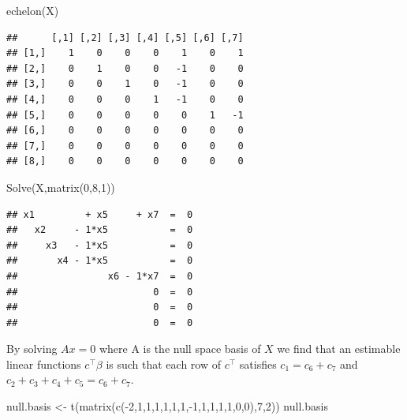 \documentclass[
]{book}
\newenvironment{Shaded}{\begin{snugshade}}{\end{snugshade}}
\newcommand{\DecValTok}[1]{\textcolor[rgb]{0.00,0.00,0.81}{#1}}
\newcommand{\FunctionTok}[1]{\textcolor[rgb]{0.00,0.00,0.00}{#1}}
\newcommand{\NormalTok}[1]{#1}
\newcommand{\OtherTok}[1]{\textcolor[rgb]{0.56,0.35,0.01}{#1}}
\newcommand{\SpecialCharTok}[1]{\textcolor[rgb]{0.00,0.00,0.00}{#1}}
\begin{document}
\begin{Shaded}
\begin{Highlighting}[]
\FunctionTok{echelon}\NormalTok{(X)}
\end{Highlighting}
\end{Shaded}

\begin{verbatim}
##      [,1] [,2] [,3] [,4] [,5] [,6] [,7]
## [1,]    1    0    0    0    1    0    1
## [2,]    0    1    0    0   -1    0    0
## [3,]    0    0    1    0   -1    0    0
## [4,]    0    0    0    1   -1    0    0
## [5,]    0    0    0    0    0    1   -1
## [6,]    0    0    0    0    0    0    0
## [7,]    0    0    0    0    0    0    0
## [8,]    0    0    0    0    0    0    0
\end{verbatim}

\begin{Shaded}
\begin{Highlighting}[]
\FunctionTok{Solve}\NormalTok{(X,}\FunctionTok{matrix}\NormalTok{(}\DecValTok{0}\NormalTok{,}\DecValTok{8}\NormalTok{,}\DecValTok{1}\NormalTok{))}
\end{Highlighting}
\end{Shaded}

\begin{verbatim}
## x1         + x5     + x7  =  0 
##   x2     - 1*x5           =  0 
##     x3   - 1*x5           =  0 
##       x4 - 1*x5           =  0 
##                x6 - 1*x7  =  0 
##                        0  =  0 
##                        0  =  0 
##                        0  =  0
\end{verbatim}

By solving \(Ax = 0\) where A is the null space basis of \(X\) we find that an estimable linear functions \(c^\top \beta\) is such that each row of \(c^\top\) satisfies \(c_1 = c_6+c_7\) and \(c_2+c_3+c_4+c_5 = c_6+c_7\).

\begin{Shaded}
\begin{Highlighting}[]
\NormalTok{null.basis }\OtherTok{\textless{}{-}} \FunctionTok{t}\NormalTok{(}\FunctionTok{matrix}\NormalTok{(}\FunctionTok{c}\NormalTok{(}\SpecialCharTok{{-}}\DecValTok{2}\NormalTok{,}\DecValTok{1}\NormalTok{,}\DecValTok{1}\NormalTok{,}\DecValTok{1}\NormalTok{,}\DecValTok{1}\NormalTok{,}\DecValTok{1}\NormalTok{,}\DecValTok{1}\NormalTok{,}\SpecialCharTok{{-}}\DecValTok{1}\NormalTok{,}\DecValTok{1}\NormalTok{,}\DecValTok{1}\NormalTok{,}\DecValTok{1}\NormalTok{,}\DecValTok{1}\NormalTok{,}\DecValTok{0}\NormalTok{,}\DecValTok{0}\NormalTok{),}\DecValTok{7}\NormalTok{,}\DecValTok{2}\NormalTok{))}
\NormalTok{null.basis}
\end{Highlighting}
\end{Shaded}
\end{document}
